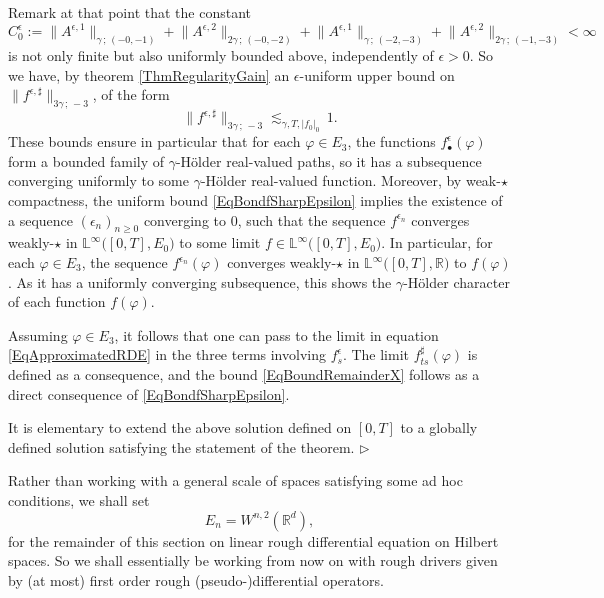 \documentclass[11pt,a4paper]{amsart}
\newcommand{\RR}{\mathbb{R}}  \newcommand{\CC}{\mathbb{C}}  \newcommand{\LL}{\mathbb{L}}  \newcommand{\WW}{\mathbb{W}}
\renewcommand{\geq}{\geqslant}
\newcommand{\ssk}{\smallskip}
\numberwithin{equation}{section} %
\newenvironment{Dem}{%
    \begin{list}{\hspace{0.5cm}{\sc Proof --}}{%
        \setlength{\topsep}{0pt}%
        \setlength{\leftmargin}{0pt}%
        \setlength{\rightmargin}{0pt}%
        \setlength{\listparindent}{0pt}%
        \setlength{\itemindent}{0pt}%
        \setlength{\parsep}{0pt}%
        \addtolength{\leftmargin}{20pt}%
        \addtolength{\rightmargin}{0pt}%
    } \item }{\hfill{\space $\rhd$}\end{list}\smallskip}
\begin{document}
\begin{Dem}
\ssk

Remark at that point that the constant 
\begin{equation*}
C^\epsilon_0 := \big\|A^{\epsilon,1}\big\|_{\gamma\,;\,(-0,-1)}  + \big\|A^{\epsilon,2}\big\|_{2\gamma\,;\,(-0,-2)} +  \big\|A^{\epsilon,1}\big\|_{\gamma\,;\,(-2,-3)}  + \big\|A^{\epsilon,2}\big\|_{2\gamma\,;\,(-1,-3)}  < \infty
\end{equation*}
is not only finite but also uniformly bounded above, independently of $\epsilon>0$. So we have, by theorem \ref{ThmRegularityGain}  an $\epsilon$-uniform upper bound on $\big\|f^{\epsilon,\sharp}\big\|_{3\gamma\,;\,-3}$, of the form
\begin{equation}
\label{EqBondfSharpEpsilon}
\big\|f^{\epsilon,\sharp}\big\|_{3\gamma\,;\,-3} \lesssim_{\gamma,T,| f_0|_0}\,1. 
\end{equation}
These bounds ensure in particular that for each $\varphi\in E_3$, the functions $f^\epsilon_\bullet(\varphi)$ form a bounded family of $\gamma$-H\"older real-valued paths, so it has a subsequence converging uniformly to some $\gamma$-H\"older real-valued function. Moreover, by weak-$\star$ compactness, the uniform bound \eqref{EqBondfSharpEpsilon} implies the existence of a sequence $(\epsilon_n)_{n\geq 0}$ converging to $0$, such that the sequence $f^{\epsilon_n}$ converges weakly-$\star$ in $\LL^\infty\big([0,T],E_0\big)$ to some limit $f\in\LL^\infty\big([0,T],E_0\big)$. In particular, for each $\varphi\in E_3$, the sequence $f^{\epsilon_n}(\varphi)$ converges weakly-$\star$ in $\LL^\infty\big([0,T],\RR\big)$ to $f(\varphi)$. As it has a uniformly converging subsequence, this shows the $\gamma$-H\"older character of each function $f(\varphi)$. 

Assuming $\varphi\in E_3$, it follows that one can pass to the limit in equation \eqref{EqApproximatedRDE} in the three terms involving $f^\epsilon_s$. The limit $f^\sharp_{ts}(\varphi)$ is defined as a consequence, and the bound \eqref{EqBoundRemainderX} follows as a direct consequence of \eqref{EqBondfSharpEpsilon}.

\ssk 

It is elementary to extend the above solution defined on $[0,T]$ to a globally defined solution satisfying the statement of the theorem.
\end{Dem}

\bigskip

Rather than working with a general scale of spaces satisfying some ad hoc conditions, we shall set 
$$
E_n = W^{n,2}(\RR^d),
$$
for the remainder of this section on linear rough differential equation on Hilbert spaces. So we shall essentially be working from now on with rough drivers given by (at most) first order rough (pseudo-)differential operators. 
\end{document}
